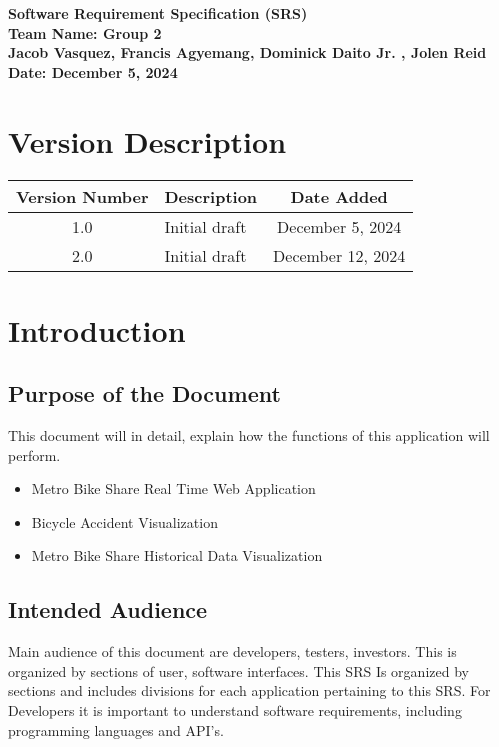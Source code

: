 \documentclass[a4paper,12pt]{article}
\begin{document}
\begin{titlepage}
    \centering
    {\Huge \textbf{Software Requirement Specification (SRS)}}\\
    \vspace{2cm}
    \textbf{Team Name: Group 2}\\
    
    \textbf{Jacob Vasquez, Francis Agyemang, Dominick Daito Jr. , Jolen Reid }\\
    \vspace{1cm}
    \textbf{Date: December 5, 2024}\\
\end{titlepage}

\tableofcontents
\newpage

\section*{Version Description}
\begin{longtable}{|c|p{8cm}|c|}
\hline
\textbf{Version Number} & \textbf{Description} & \textbf{Date Added} \\
\hline
1.0 & Initial draft & December 5, 2024 \\
2.0 & Initial draft & December 12, 2024 \\

\hline
\end{longtable}

\section{Introduction}
\subsection{Purpose of the Document}
This document will in detail, explain how the functions of this application will perform. 
\begin{itemize}
    \item Metro Bike Share Real Time Web Application
    \item Bicycle Accident Visualization
    \item Metro Bike Share Historical Data Visualization
    
\end{itemize}
\subsection{Intended Audience}
Main audience of this document are developers, testers, investors. This is organized by sections of user, software interfaces. This SRS Is organized by sections and includes divisions for each application pertaining to this SRS. For Developers it is important to understand software requirements, including programming languages and API's. 
\end{document}
